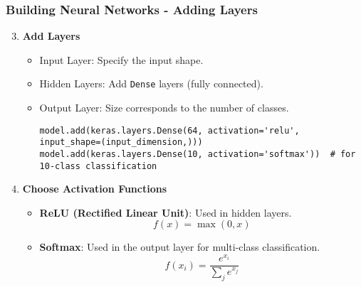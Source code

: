 \documentclass[aspectratio=169]{beamer}
\begin{document}
\begin{frame}[fragile]
    \frametitle{Building Neural Networks - Adding Layers}
    \begin{enumerate}
        \setcounter{enumi}{2}
        \item \textbf{Add Layers}
        \begin{itemize}
            \item Input Layer: Specify the input shape.
            \item Hidden Layers: Add \texttt{Dense} layers (fully connected).
            \item Output Layer: Size corresponds to the number of classes.
            \begin{lstlisting}
model.add(keras.layers.Dense(64, activation='relu', input_shape=(input_dimension,)))
model.add(keras.layers.Dense(10, activation='softmax'))  # for 10-class classification
            \end{lstlisting}
        \end{itemize}
        
        \item \textbf{Choose Activation Functions}
        \begin{itemize}
            \item \textbf{ReLU (Rectified Linear Unit)}: Used in hidden layers.
              \begin{equation}
              f(x) = \max(0, x)
              \end{equation}
            \item \textbf{Softmax}: Used in the output layer for multi-class classification.
              \begin{equation}
              f(x_i) = \frac{e^{x_i}}{\sum_{j} e^{x_j}}
              \end{equation}
        \end{itemize}
    \end{enumerate}
\end{frame}
\end{document}
